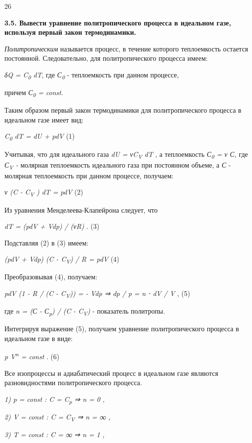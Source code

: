 26

\textbf{3.5. Вывести уравнение политропического процесса в идеальном
газе, используя первый закон термодинамики.}

\solving{}

\emph{Политропическим} называется процесс, в течение которого
теплоемкость остается постоянной. Следовательно, для политропического
процесса имеем:

\emph{δQ = C\textsubscript{0} dT}, где \emph{С\textsubscript{0}} -
теплоемкость при данном процессе,

причем \emph{С\textsubscript{0} = const}.

Таким образом первый закон термодинамики для политропического процесса в
идеальном газе имеет вид:

\emph{C\textsubscript{0} dT = dU + pdV} (1)

Учитывая, что для идеального газа \emph{dU = νC\textsubscript{V} dT} , а
теплоемкость \emph{С\textsubscript{0} = ν С,} где
\emph{С\textsubscript{V} -} молярная теплоемкость идеального газа при
постоянном объеме, а \emph{С} - молярная теплоемкость при данном
процессе, получаем:

\emph{ν (C - C\textsubscript{V} ) dT = pdV} (2)

Из уравнения Менделеева-Клапейрона следует, что

\emph{dT = (pdV + Vdp) / (νR)} . (3)

Подставляя (2) в (3) имеем:

\emph{(pdV + Vdp) (C - C\textsubscript{V}) / R = pdV} (4)

Преобразовывая (4), получаем:

\emph{pdV (1 - R / (C - C\textsubscript{V})) = - Vdp ⇒ dp / p = n ⋅ dV /
V} , (5)

где \emph{n = (С - С\textsubscript{p}) / (C - C\textsubscript{V})} -
показатель политропы.

Интегрируя выражение (5), получаем уравнение политропического процесса в
идеальном газе в виде:

\emph{p V\textsuperscript{n} = const} . (6)

Все изопроцессы и адиабатический процесс в идеальном газе являются
разновидностями политропического процесса.

\emph{1) p = const : C = C\textsubscript{p} ⇒ n = 0 ,}

\emph{2) V = const : C = C\textsubscript{V} ⇒ n = ∞ ,}

\emph{3) T = const : C = ∞ ⇒ n = 1 ,}


